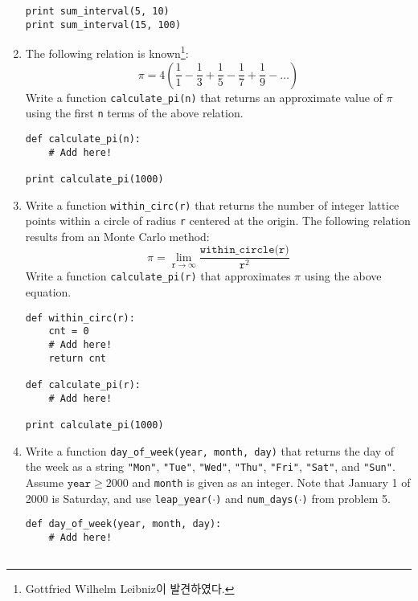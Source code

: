 \documentclass[../main.tex]{subfiles}
\begin{document}
\begin{enumerate}
\begin{verbatim}
print sum_interval(5, 10)
print sum_interval(15, 100)
\end{verbatim}

\item The following relation is known\footnote{Gottfried Wilhelm Leibniz이 발견하였다.}:
$$
\pi = 4\left(\frac11 - \frac13 + \frac 15 - \frac17 + \frac19 - \dots\right)
$$
Write a function \texttt{calculate\_pi(n)} that returns an approximate value of $\pi$ using the first \texttt{n} terms of the above relation.
\begin{verbatim}
def calculate_pi(n):
	# Add here!

print calculate_pi(1000)
\end{verbatim}

\item Write a function \texttt{within\_circ(r)} that returns the number of integer lattice points within a circle of radius \texttt{r} centered at the origin.
The following relation results from an Monte Carlo method:
$$
\pi = \lim_{\texttt{r} \rightarrow \infty} \frac{\texttt{within\_circle(r)}}{\texttt{r}^2}
$$
Write a function \texttt{calculate\_pi(r)} that approximates $\pi$ using the above equation.
\begin{verbatim}
def within_circ(r):
	cnt = 0
	# Add here!
	return cnt

def calculate_pi(r):
	# Add here!

print calculate_pi(1000)
\end{verbatim}

\item Write a function \texttt{day\_of\_week(year, month, day)} that returns the day of the week as a string \texttt{"Mon"}, \texttt{"Tue"}, \texttt{"Wed"}, \texttt{"Thu"}, \texttt{"Fri"}, \texttt{"Sat"}, and \texttt{"Sun"}.
Assume $\texttt{year} \geq 2000$ and \texttt{month} is given as an integer.
Note that January 1 of 2000 is Saturday, and use \texttt{leap\_year($\cdot$)} and \texttt{num\_days($\cdot$)} from problem 5.
\begin{verbatim}
def day_of_week(year, month, day):
	# Add here!


\end{verbatim}
\end{enumerate}
\end{document}
